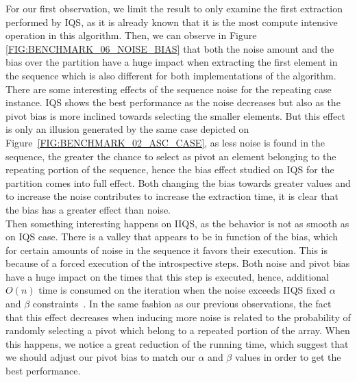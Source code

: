 For our first observation, we limit the result to only examine the first extraction performed by IQS, as it is already known that it is the most compute intensive operation in this algorithm. Then, we can observe in Figure \ref{FIG:BENCHMARK_06_NOISE_BIAS} that both the noise amount and the bias over the partition have a huge impact when extracting the first element in the sequence which is also different for both implementations of the algorithm.\\

There are some interesting effects of the sequence noise for the repeating case instance. IQS shows the best performance as the noise decreases but also as the pivot bias is more inclined towards selecting the smaller elements. But this effect is only an illusion generated by the same case depicted on Figure~\ref{FIG:BENCHMARK_02_ASC_CASE}, as less noise is found in the sequence, the greater the chance to select as pivot an element belonging to the repeating portion of the sequence, hence the bias effect studied on IQS for the partition comes into full effect. Both changing the bias towards greater values and to increase the noise contributes to increase the extraction time, it is clear that the bias has a greater effect than noise. \\

Then something interesting happens on IIQS, as the behavior is not as smooth as on IQS case. There is a valley that appears to be in function of the bias, which for certain amounts of noise in the sequence it favors their execution. This is because of a forced execution of the introspective steps. Both noise and pivot bias have a huge impact on the times that this step is executed, hence, additional $O(n)$ time is consumed on the iteration when the noise exceeds IIQS fixed $\alpha$ and $\beta$ constraints~\cite{7416566}. In the same fashion as our previous observations, the fact that this effect decreases when inducing more noise is related to the probability of randomly selecting a pivot which belong to a repeated portion of the array. When this happens, we notice a great reduction of the running time, which suggest that we should adjust our pivot bias to match our $\alpha$ and $\beta$ values in order to get the best performance.\\


